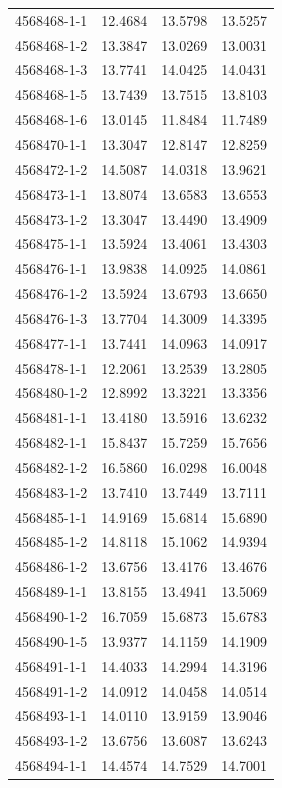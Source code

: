 \begin{longtable}{lrrr}
4568468-1-1 & 12.4684 & 13.5798 & 13.5257 \\
4568468-1-2 & 13.3847 & 13.0269 & 13.0031 \\
4568468-1-3 & 13.7741 & 14.0425 & 14.0431 \\
4568468-1-5 & 13.7439 & 13.7515 & 13.8103 \\
4568468-1-6 & 13.0145 & 11.8484 & 11.7489 \\
4568470-1-1 & 13.3047 & 12.8147 & 12.8259 \\
4568472-1-2 & 14.5087 & 14.0318 & 13.9621 \\
4568473-1-1 & 13.8074 & 13.6583 & 13.6553 \\
4568473-1-2 & 13.3047 & 13.4490 & 13.4909 \\
4568475-1-1 & 13.5924 & 13.4061 & 13.4303 \\
4568476-1-1 & 13.9838 & 14.0925 & 14.0861 \\
4568476-1-2 & 13.5924 & 13.6793 & 13.6650 \\
4568476-1-3 & 13.7704 & 14.3009 & 14.3395 \\
4568477-1-1 & 13.7441 & 14.0963 & 14.0917 \\
4568478-1-1 & 12.2061 & 13.2539 & 13.2805 \\
4568480-1-2 & 12.8992 & 13.3221 & 13.3356 \\
4568481-1-1 & 13.4180 & 13.5916 & 13.6232 \\
4568482-1-1 & 15.8437 & 15.7259 & 15.7656 \\
4568482-1-2 & 16.5860 & 16.0298 & 16.0048 \\
4568483-1-2 & 13.7410 & 13.7449 & 13.7111 \\
4568485-1-1 & 14.9169 & 15.6814 & 15.6890 \\
4568485-1-2 & 14.8118 & 15.1062 & 14.9394 \\
4568486-1-2 & 13.6756 & 13.4176 & 13.4676 \\
4568489-1-1 & 13.8155 & 13.4941 & 13.5069 \\
4568490-1-2 & 16.7059 & 15.6873 & 15.6783 \\
4568490-1-5 & 13.9377 & 14.1159 & 14.1909 \\
4568491-1-1 & 14.4033 & 14.2994 & 14.3196 \\
4568491-1-2 & 14.0912 & 14.0458 & 14.0514 \\
4568493-1-1 & 14.0110 & 13.9159 & 13.9046 \\
4568493-1-2 & 13.6756 & 13.6087 & 13.6243 \\
4568494-1-1 & 14.4574 & 14.7529 & 14.7001 \\

\end{longtable}
